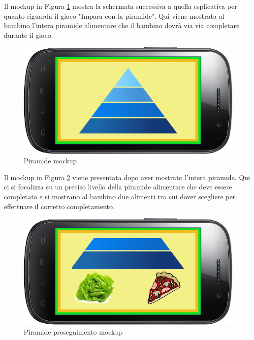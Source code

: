 Il mockup in Figura \ref{fig:Piramide} mostra la schermata successiva a quella esplicativa per quanto riguarda il gioco "Impara con la piramide". Qui viene mostrata al bambino l'intera piramide alimentare che il bambino dovrà via via completare durante il gioco.
\vspace{70pt}
\begin{figure}[htbp]
\centering
\includegraphics[width=\textwidth]{Images/Mockup/piramide}
\caption{Piramide mockup}
\label{fig:Piramide}
\end{figure}
\clearpage

Il mockup in Figura \ref{fig:Piramide proseguimento} viene presentata dopo aver mostrato l'intera piramide. Qui ci si focalizza su un preciso livello della piramide alimentare che deve essere completato e si mostrano al bambino due alimenti tra cui dover scegliere per effettuare il corretto completamento.
\vspace{70pt}
\begin{figure}[htbp]
\centering
\includegraphics[width=\textwidth]{Images/Mockup/piramide2}
\caption{Piramide proseguimento mockup}
\label{fig:Piramide proseguimento}
\end{figure}
\clearpage

